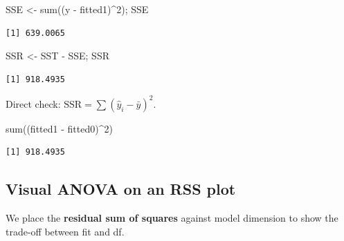 \documentclass[
  letterpaper,
]{scrbook}
\newenvironment{Shaded}{\begin{snugshade}}{\end{snugshade}}
\newcommand{\DecValTok}[1]{\textcolor[rgb]{0.68,0.00,0.00}{#1}}
\newcommand{\FunctionTok}[1]{\textcolor[rgb]{0.28,0.35,0.67}{#1}}
\newcommand{\NormalTok}[1]{\textcolor[rgb]{0.00,0.23,0.31}{#1}}
\newcommand{\OtherTok}[1]{\textcolor[rgb]{0.00,0.23,0.31}{#1}}
\newcommand{\SpecialCharTok}[1]{\textcolor[rgb]{0.37,0.37,0.37}{#1}}
\begin{document}
\begin{Shaded}
\begin{Highlighting}[]
\NormalTok{SSE }\OtherTok{\textless{}{-}} \FunctionTok{sum}\NormalTok{((y }\SpecialCharTok{{-}}\NormalTok{ fitted1)}\SpecialCharTok{\^{}}\DecValTok{2}\NormalTok{); SSE}
\end{Highlighting}
\end{Shaded}

\begin{verbatim}
[1] 639.0065
\end{verbatim}

\begin{Shaded}
\begin{Highlighting}[]
\NormalTok{SSR }\OtherTok{\textless{}{-}}\NormalTok{ SST }\SpecialCharTok{{-}}\NormalTok{ SSE; SSR}
\end{Highlighting}
\end{Shaded}

\begin{verbatim}
[1] 918.4935
\end{verbatim}

Direct check: \(\text{SSR}=\sum(\hat y_i-\bar y)^2\).

\begin{Shaded}
\begin{Highlighting}[]
\FunctionTok{sum}\NormalTok{((fitted1 }\SpecialCharTok{{-}}\NormalTok{ fitted0)}\SpecialCharTok{\^{}}\DecValTok{2}\NormalTok{)}
\end{Highlighting}
\end{Shaded}

\begin{verbatim}
[1] 918.4935
\end{verbatim}

\subsection{Visual ANOVA on an RSS
plot}\label{visual-anova-on-an-rss-plot}

We place the \textbf{residual sum of squares} against model dimension to
show the trade-off between fit and df.
\end{document}

